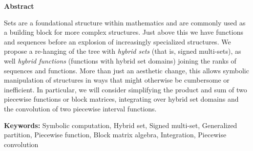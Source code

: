 \Large\begin{center}\textbf{Abstract}\end{center}\normalsize


Sets are a foundational structure within mathematics and are commonly used as a building block for more complex structures.
Just above this we have functions and sequences before an explosion of increasingly specialized structures.
We propose a re-hanging of the tree with \emph{hybrid sets} (that is, signed multi-sets), 
as well \emph{hybrid functions} (functions with hybrid set domains) joining the ranks of sequences and functions.
More than just an aesthetic change, this allows symbolic manipulation of structures in ways that might otherwise be cumbersome or inefficient.
In particular, we will consider simplifying the product and sum of two piecewise functions or block matrices, 
integrating over hybrid set domains and the convolution of two piecewise interval functions.

\vfill
\textbf{Keywords:} 
Symbolic computation, 
Hybrid set, 
Signed multi-set,
Generalized partition, 
Piecewise function, 
Block matrix algebra, 
Integration,
Piecewise convolution